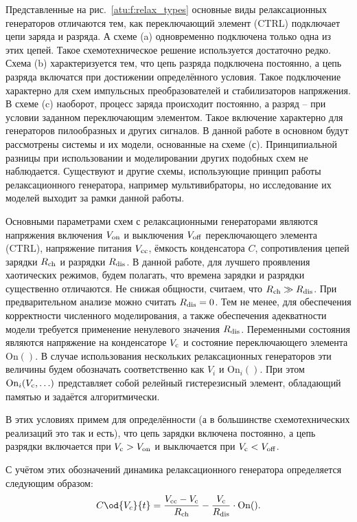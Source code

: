 Представленные на рис.~\ref{atu:f:relax_types}
основные виды релаксационных генераторов отличаются
тем, как переключающий элемент (CTRL)
подключает цепи заряда и разряда. А схеме (a)
одновременно подключена только одна из этих цепей.
Такое схемотехническое решение используется достаточно редко.
Схема (b) характеризуется тем, что цепь разряда
подключена постоянно, а цепь разряда
включатся при достижении определённого условия. Такое подключение
характерно для схем импульсных преобразователей и стабилизаторов
напряжения. В схеме (c) наоборот, процесс заряда происходит постоянно,
а разряд -- при условии заданном переключающим элементом. Такое
включение характерно для генераторов пилообразных и других сигналов.
В данной работе в основном будут рассмотрены системы и их модели,
основанные на схеме (с). Принципиальной разницы при использовании
и моделировании других подобных схем не наблюдается.
Существуют и другие схемы, использующие принцип работы
релаксационного генератора, например мультивибраторы,
но исследование их моделей выходит за рамки данной работы.


Основными параметрами схем с релаксационными генераторами являются
напряжения включения $V_\mathrm{on}$ и выключения $V_\mathrm{off}$
переключающего элемента (CTRL),
напряжение питания $V_\mathrm{cc}$,
ёмкость конденсатора $C$,
сопротивления цепей зарядки $R_\mathrm{ch}$
и разрядки $R_\mathrm{dis}$.
В данной работе, для лучшего проявления
хаотических режимов,
будем полагать, что времена зарядки и разрядки существенно отличаются.
Не снижая общности, считаем, что $R_\mathrm{ch} \gg R_\mathrm{dis} $.
При предварительном анализе можно считать $R_\mathrm{dis} = 0$.
Тем не менее, для обеспечения корректности численного моделирования,
а также обеспечения адекватности модели требуется применение ненулевого значения $R_\mathrm{dis}$.
Переменными состояния являются напряжение на конденсаторе $V_\mathrm{c}$
и состояние переключающего элемента $\mathrm{On}()$.
В случае использования нескольких релаксационных генераторов
эти величины будем обозначать соответственно как
$V_{i}$ и $ \mathrm{On}_{i}()$.
При этом  $ \mathrm{On}_{i}( V_\mathrm{c}, \ldots )$ представляет собой
релейный гистерезисный элемент, обладающий памятью и задаётся алгоритмически.

В этих условиях примем для определённости
(а в большинстве схемотехнических реализаций это так и есть),
что цепь зарядки включена постоянно, а цепь разрядки
включается при $V_\mathrm{c} > V_\mathrm{on} $ и выключается при
$V_\mathrm{c} < V_\mathrm{off}$.

С учётом этих обозначений динамика релаксационного генератора
определяется следующим образом:
%
\begin{equation}
  C \od{V_c}{t}
  =
  \frac{V\Tidx{cc} - V\Tidx{c}}{R\Tidx{ch}}
  - \frac{V\Tidx{c}}{R\Tidx{dis}} \cdot \mathrm{On}().
  \label{atu:eq:relax0}
\end{equation}

